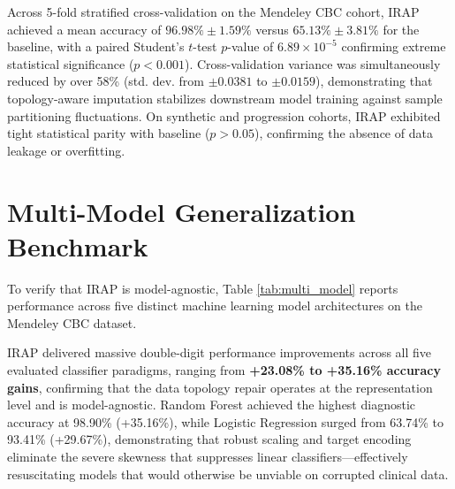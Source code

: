 \documentclass[MTech]{ugthesis}
\begin{document}
Across 5-fold stratified cross-validation on the Mendeley CBC cohort, IRAP achieved a mean accuracy of $96.98\% \pm 1.59\%$ versus $65.13\% \pm 3.81\%$ for the baseline, with a paired Student's $t$-test $p$-value of \textbf{$6.89 \times 10^{-5}$} confirming extreme statistical significance ($p < 0.001$). Cross-validation variance was simultaneously reduced by over 58\% (std. dev. from $\pm 0.0381$ to $\pm 0.0159$), demonstrating that topology-aware imputation stabilizes downstream model training against sample partitioning fluctuations. On synthetic and progression cohorts, IRAP exhibited tight statistical parity with baseline ($p > 0.05$), confirming the absence of data leakage or overfitting.

\section{Multi-Model Generalization Benchmark}
To verify that \ac{IRAP} is model-agnostic, Table \ref{tab:multi_model} reports performance across five distinct machine learning model architectures on the Mendeley \ac{CBC} dataset.

\begin{table}[htpb]
\small
\centering
\renewcommand{\arraystretch}{1.3}
\caption{Multi-model generalization benchmark on the Mendeley CBC Hematology dataset.}
\label{tab:multi_model}
\end{table}

IRAP delivered massive double-digit performance improvements across all five evaluated classifier paradigms, ranging from \textbf{+23.08\% to +35.16\% accuracy gains}, confirming that the data topology repair operates at the representation level and is model-agnostic. Random Forest achieved the highest diagnostic accuracy at 98.90\% (+35.16\%), while Logistic Regression surged from 63.74\% to 93.41\% (+29.67\%), demonstrating that robust scaling and target encoding eliminate the severe skewness that suppresses linear classifiers—effectively resuscitating models that would otherwise be unviable on corrupted clinical data.
\end{document}
